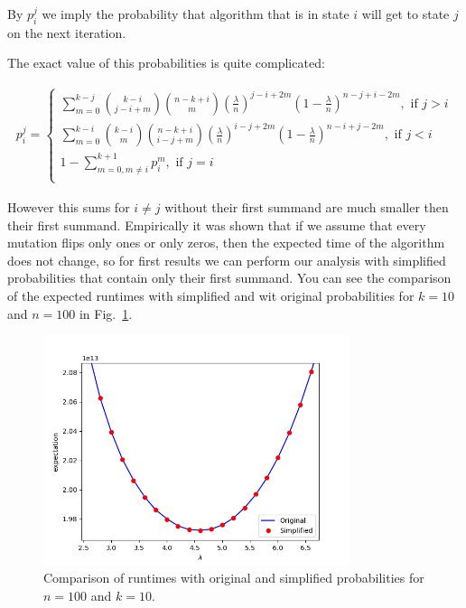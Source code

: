\documentclass{article}
\begin{document}
By $p_i^j$ we imply the probability that algorithm that is in state $i$ will get to state $j$ on the next iteration.

The exact value of this probabilities is quite complicated:

\begin{align*}
  p_i^j = \begin{cases}
    \sum\limits_{m = 0}^{k - j} \binom{k - i}{j - i + m} \binom{n - k + i}{m} \left(\frac{\lambda}{n}\right)^{j - i + 2m} \left(1 - \frac{\lambda}{n}\right)^{n - j + i - 2m}, \text{ if } j > i \\
      \sum\limits_{m = 0}^{k - i} \binom{k - i}{m} \binom{n - k + i}{i - j + m} \left(\frac{\lambda}{n}\right)^{i - j + 2m} \left(1 - \frac{\lambda}{n}\right)^{n - i + j - 2m}, \text{ if } j < i \\
      1 - \sum\limits_{m = 0, m \ne i}^{k + 1} p_i^m, \text{ if } j = i \\
  \end{cases}
\end{align*}

However this sums for $i \ne j$ without their first summand are much smaller then their first summand. Empirically it was shown that if we assume that every mutation flips only ones or only zeros, then the expected time of the algorithm does not change, so for first results we can perform our analysis with simplified probabilities that contain only their first summand. You can see the comparison of the expected runtimes with simplified and wit original probabilities for $k = 10$ and $n = 100$ in Fig.~\ref{plot_simpl}.

\begin{figure}[t]
 \includegraphics[width=0.8\textwidth]{pic/simplified_probs.png}
 \caption{Comparison of runtimes with original and simplified probabilities for $n = 100$ and $k = 10$.
 \label{plot_simpl}}
\end{figure}
\end{document}
